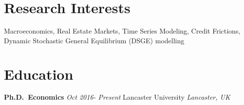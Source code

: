 \documentclass[10pt,]{article}
\begin{document}
              
              
              
              
              
              \hypertarget{research-interests}{%
              \section{Research Interests}\label{research-interests}}
              
              Macroeconomics, Real Estate Markets, Time Series Modeling, Credit
              Frictions, Dynamic Stochastic General Equilibrium (DSGE) modelling
              
              \hypertarget{education}{%
              \section{Education}\label{education}}
              
              \vspace{2mm}
              
              \textbf{Ph.D.~Economics} \hfill { \emph{Oct 2016- Present} } \newline 
              Lancaster University \hfill { \emph{Lancaster, UK} }
              
\end{document}
